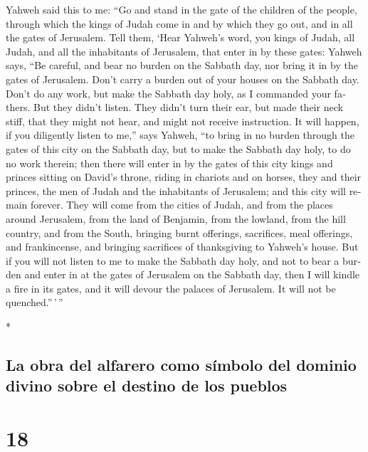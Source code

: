 \begin{paracol}{2}
\begin{otherlanguage}{english}
 Yahweh said this to me: ``Go and stand in the gate of
the children of the people, through which the kings of Judah come in and
by which they go out, and in all the gates of Jerusalem. 
Tell them, `Hear Yahweh's word, you kings of Judah, all Judah, and all
the inhabitants of Jerusalem, that enter in by these gates:
 Yahweh says, ``Be careful, and bear no burden on the
Sabbath day, nor bring it in by the gates of Jerusalem. 
Don't carry a burden out of your houses on the Sabbath day. Don't do any
work, but make the Sabbath day holy, as I commanded your fathers.
 But they didn't listen. They didn't turn their ear, but
made their neck stiff, that they might not hear, and might not receive
instruction.  It will happen, if you diligently listen to
me,'' says Yahweh, ``to bring in no burden through the gates of this
city on the Sabbath day, but to make the Sabbath day holy, to do no work
therein;  then there will enter in by the gates of this
city kings and princes sitting on David's throne, riding in chariots and
on horses, they and their princes, the men of Judah and the inhabitants
of Jerusalem; and this city will remain forever.  They
will come from the cities of Judah, and from the places around
Jerusalem, from the land of Benjamin, from the lowland, from the hill
country, and from the South, bringing burnt offerings, sacrifices, meal
offerings, and frankincense, and bringing sacrifices of thanksgiving to
Yahweh's house.  But if you will not listen to me to make
the Sabbath day holy, and not to bear a burden and enter in at the gates
of Jerusalem on the Sabbath day, then I will kindle a fire in its gates,
and it will devour the palaces of Jerusalem. It will not be
quenched.''\,'\,''

\end{otherlanguage}

\switchcolumn[0]*

\hypertarget{la-obra-del-alfarero-como-suxedmbolo-del-dominio-divino-sobre-el-destino-de-los-pueblos}{%
\subsection{La obra del alfarero como símbolo del dominio divino sobre
el destino de los
pueblos}\label{la-obra-del-alfarero-como-suxedmbolo-del-dominio-divino-sobre-el-destino-de-los-pueblos}}

\hypertarget{section-34}{%
\section{18}\label{section-34}}


\end{paracol}
